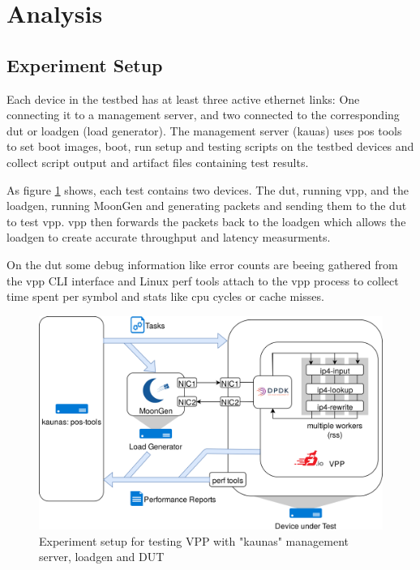 
\section{Analysis}


\subsection{Experiment Setup}

Each device in the testbed has at least three active ethernet links:
One connecting it to a management server, and two connected to the
corresponding \Ac{dut} or loadgen (load generator). The management
server (kauas) uses pos tools to set boot images, boot, run setup and
testing scripts on the testbed devices and collect script output and
artifact files containing test results.

As figure \ref{setup} shows, each test contains two devices. The
\Ac{dut}, running \Ac{vpp}, and the loadgen, running MoonGen and
generating packets and sending them to the \Ac{dut} to test \Ac{vpp}.
\Ac{vpp} then forwards the packets back to the loadgen which allows
the loadgen to create accurate throughput and latency measurments.

On the \Ac{dut} some debug information like error counts are beeing
gathered from the \Ac{vpp} CLI interface and Linux perf tools
\cite{perf} attach to the vpp process to collect time spent per symbol
and stats like cpu cycles or cache misses.

\begin{figure}[!ht]
\noindent\hspace{0.5mm}\includegraphics[width=\linewidth]{pics/topology.png}
\caption{Experiment setup for testing VPP with "kaunas" management server, loadgen and DUT}
\label{setup}
\end{figure}


